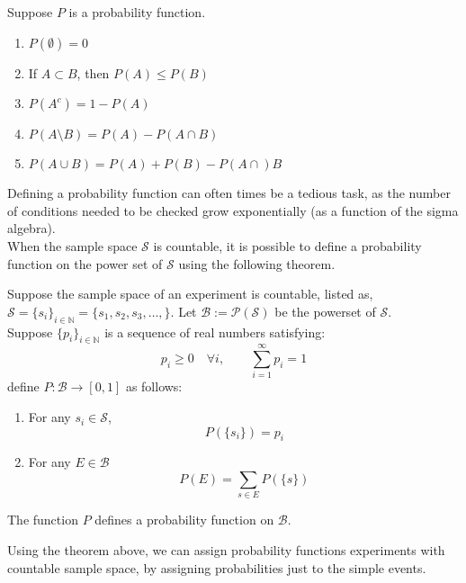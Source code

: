 \begin{thm}
Suppose $P$ is a probability function.
\begin{enumerate}[itemsep=0pt, topsep=1pt, partopsep=0pt,label=(\roman*)]
\item $P(\emptyset)=0$
\item If $A \subset B$, then $P(A)\le P(B)$
\item $P(A^c)=1-P(A)$
\item $P(A\setminus B)=P(A)-P(A\cap B)$
\item $P(A\cup B) =P(A)+P(B)-P(A\cap)B$
\end{enumerate}
\end{thm}
Defining a probability function can often times be a tedious task, as the number of conditions needed to be checked grow exponentially (as a function of the sigma algebra). 
\\
When the sample space $\mathcal{S}$ is countable, it is possible to define a probability function on the power set of $\mathcal{S}$ using the following theorem.

\begin{thm}
    Suppose the sample space of an experiment is countable, listed as, $\mathcal{S} = \{s_i\}_{i\in \mathbb{N}} = \{s_1, s_2, s_3, \dots, \}$. Let $\mathcal{B}:=\mathcal{P}(\mathcal{S})$ be the powerset of $\mathcal{S}$. 
    \\
    Suppose $\{p_i\}_{i\in \mathbb{N}}$ is a sequence of real numbers satisfying:
    $$ p_i \ge 0 \quad \forall i, \quad \quad \sum_{i=1}^\infty p_i = 1$$
    define $P:\mathcal{B} \rightarrow [0,1]$
    as follows:
    \begin{enumerate}
        \item For any $s_i \in \mathcal{S}$, $$P(\{s_i\}) = p_i$$
        \item For any $E \in \mathcal{B}$
        $$P(E) = \sum_{s\in E} P(\{s\})$$
    \end{enumerate}
    The function $P$ defines a probability function on $\mathcal{B}$. 
\end{thm}

Using the theorem above, we can assign probability functions experiments with countable sample space, by assigning probabilities just to the simple events. 

